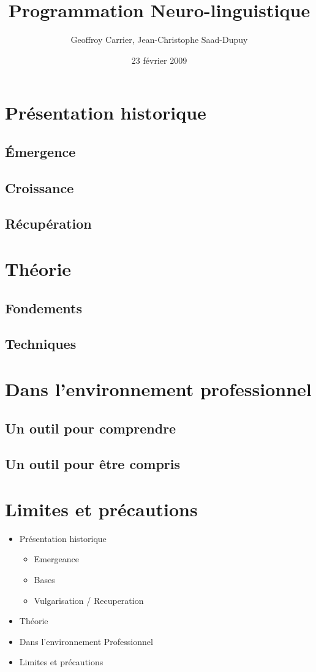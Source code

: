 \documentclass{beamer}
\title{Programmation Neuro-linguistique}
\author{Geoffroy Carrier, Jean-Christophe Saad-Dupuy}
\institute{Université Joseph Fourier, L3 MIAGE}
\date{23 février 2009}
\begin{document}
\frame{\titlepage}

\section{Présentation historique}
\subsection{Émergence}
\subsection{Croissance}
\subsection{Récupération}

\section{Théorie}
\subsection{Fondements}
\subsection{Techniques}
\section{Dans l'environnement professionnel}
\subsection{Un outil pour comprendre}
\subsection{Un outil pour être compris}
\section{Limites et précautions}

\begin{frame}
	\begin{itemize}
	\item Présentation historique
		\begin{itemize}
			\item Emergeance
			\item Bases
			\item Vulgarisation / Recuperation
		\end{itemize}
	\item Théorie
	\item Dans l'environnement Professionnel
	\item Limites et précautions
	\end{itemize}
\end{frame}

\end{document}
